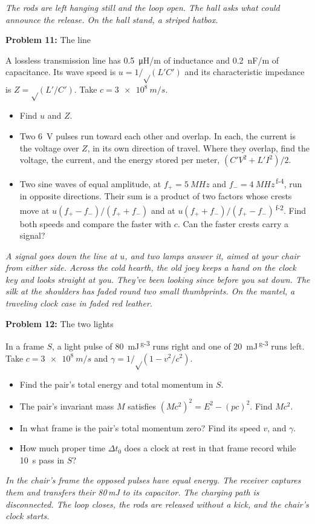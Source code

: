 \documentclass[11pt]{article}
\newcommand{\room}[1]{\par\bigskip{\large\bfseries #1}\par\nopagebreak\smallskip}
\newcommand{\scene}[1]{\par{\itshape #1}\par}
\newcommand{\problem}[2]{\par\medskip\textbf{Problem #1:} #2\par\nopagebreak}
\newenvironment{parts}{\begin{itemize}[leftmargin=3.4em,labelwidth=2.8em,labelsep=0.6em,align=left,itemsep=2pt,topsep=3pt]}{\end{itemize}}
\newcommand{\pt}[1]{\item[\textbf{#1}]}
\newcommand{\sv}[1]{\textsuperscript{\dag\,#1}}
\newcommand{\rt}{\text{√}}  %
\begin{document}
\room{Hall}
\scene{The rods are left hanging still and the loop open. The hall asks what could announce the release. On the hall stand, a striped hatbox.}
\problem{11}{The line}
A lossless transmission line has \SI{0.5}{\micro H/m} of inductance and \SI{0.2}{nF/m} of capacitance. Its wave speed is $u = 1/\rt(L'C')$ and its characteristic impedance is $Z = \rt(L'/C')$. Take $c = \SI{3e8}{m/s}$.
\begin{parts}
\pt{11-a} Find $u$ and $Z$.
\pt{11-b} Two \SI{6}{V} pulses run toward each other and overlap. In each, the current is the voltage over $Z$, in its own direction of travel. Where they overlap, find the voltage, the current, and the energy stored per meter, $(C'V^2 + L'I^2)/2$.
\pt{11-c} Two sine waves of equal amplitude, at $f_+ = \SI{5}{MHz}$ and $f_- = \SI{4}{MHz}$\sv{f-4}, run in opposite directions. Their sum is a product of two factors whose crests move at $u(f_+ - f_-)/(f_+ + f_-)$ and at $u(f_+ + f_-)/(f_+ - f_-)$\sv{f-2}. Find both speeds and compare the faster with $c$. Can the faster crests carry a signal?
\end{parts}

\room{Lounge}
\scene{A signal goes down the line at $u$, and two lamps answer it, aimed at your chair from either side. Across the cold hearth, the old joey keeps a hand on the clock key and looks straight at you. They've been looking since before you sat down. The silk at the shoulders has faded round two small thumbprints. On the mantel, a traveling clock case in faded red leather.}
\problem{12}{The two lights}
In a frame $S$, a light pulse of \SI{80}{mJ}\sv{g-3} runs right and one of \SI{20}{mJ}\sv{g-3} runs left. Take $c = \SI{3e8}{m/s}$ and $\gamma = 1/\rt(1 - v^2/c^2)$.
\begin{parts}
\pt{12-a} Find the pair's total energy and total momentum in $S$.
\pt{12-b} The pair's invariant mass $M$ satisfies $(Mc^2)^2 = E^2 - (pc)^2$. Find $Mc^2$.
\pt{12-c} In what frame is the pair's total momentum zero? Find its speed $v$, and $\gamma$.
\pt{12-d} How much proper time $\Delta t_0$ does a clock at rest in that frame record while \SI{10}{s} pass in $S$?
\end{parts}
\scene{In the chair's frame the opposed pulses have equal energy. The receiver captures them and transfers their 80\,mJ to its capacitor. The charging path is disconnected. The loop closes, the rods are released without a kick, and the chair's clock starts.}
\end{document}

